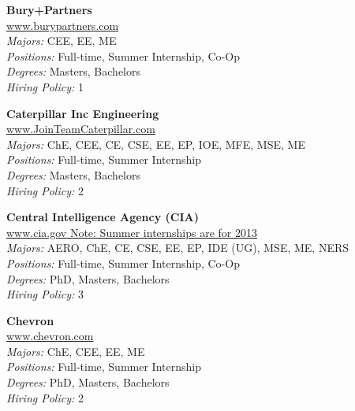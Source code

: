 \documentclass[twoside]{article}
\begin{document}
\begin{center}
\begin{multicols}{3}
\begin{minipage}{.9\columnwidth}{\Large\bf Bury+Partners }\\
	\url{www.burypartners.com}\\
	\emph{Majors:} CEE, EE, ME\\
	\emph{Positions:} Full-time, Summer Internship, Co-Op\\
	\emph{Degrees:} Masters, Bachelors\\
	\emph{Hiring Policy:} 1\\
\end{minipage}
 
\begin{minipage}{.9\columnwidth}{\Large\bf Caterpillar Inc Engineering }\\
	\url{www.JoinTeamCaterpillar.com}\\
	\emph{Majors:} ChE, CEE, CE, CSE, EE, EP, IOE, MFE, MSE, ME\\
	\emph{Positions:} Full-time, Summer Internship\\
	\emph{Degrees:} Masters, Bachelors\\
	\emph{Hiring Policy:} 2\\
\end{minipage}
 
\begin{minipage}{.9\columnwidth}{\Large\bf Central Intelligence Agency (CIA) }\\
	\url{www.cia.gov Note: Summer internships are for 2013}\\
	\emph{Majors:} AERO, ChE, CE, CSE, EE, EP, IDE (UG), MSE, ME, NERS\\
	\emph{Positions:} Full-time, Summer Internship, Co-Op\\
	\emph{Degrees:} PhD, Masters, Bachelors\\
	\emph{Hiring Policy:} 3\\
\end{minipage}
 
\begin{minipage}{.9\columnwidth}{\Large\bf Chevron }\\
	\url{www.chevron.com}\\
	\emph{Majors:} ChE, CEE, EE, ME\\
	\emph{Positions:} Full-time, Summer Internship\\
	\emph{Degrees:} PhD, Masters, Bachelors\\
	\emph{Hiring Policy:} 2\\
\end{minipage}
 

\end{multicols}
\end{center}
\end{document}
